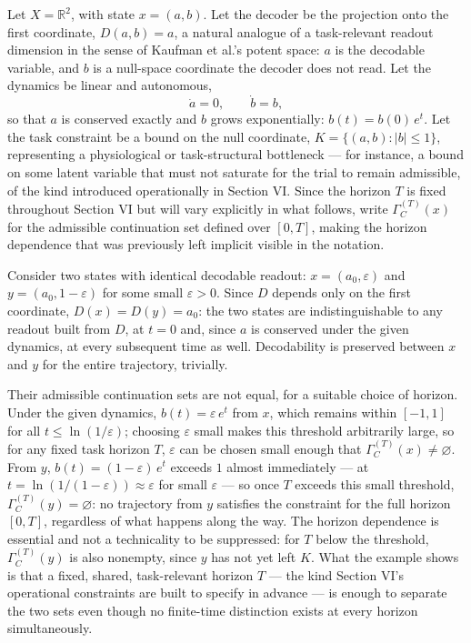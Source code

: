 \documentclass[11pt]{article}
\begin{document}
Let $X = \mathbb{R}^2$, with state $x = (a, b)$. Let the decoder be the projection onto the first coordinate, $D(a,b) = a$, a natural analogue of a task-relevant readout dimension in the sense of Kaufman et al.'s potent space: $a$ is the decodable variable, and $b$ is a null-space coordinate the decoder does not read. Let the dynamics be linear and autonomous,
\[
\dot a = 0, \qquad \dot b = b,
\]
so that $a$ is conserved exactly and $b$ grows exponentially: $b(t) = b(0)\, e^{t}$. Let the task constraint be a bound on the null coordinate, $K = \{(a,b) : |b| \le 1\}$, representing a physiological or task-structural bottleneck — for instance, a bound on some latent variable that must not saturate for the trial to remain admissible, of the kind introduced operationally in Section VI. Since the horizon $T$ is fixed throughout Section VI but will vary explicitly in what follows, write $\Gamma_C^{(T)}(x)$ for the admissible continuation set defined over $[0,T]$, making the horizon dependence that was previously left implicit visible in the notation.

Consider two states with identical decodable readout: $x = (a_0, \varepsilon)$ and $y = (a_0, 1-\varepsilon)$ for some small $\varepsilon > 0$. Since $D$ depends only on the first coordinate, $D(x) = D(y) = a_0$: the two states are indistinguishable to any readout built from $D$, at $t=0$ and, since $a$ is conserved under the given dynamics, at every subsequent time as well. Decodability is preserved between $x$ and $y$ for the entire trajectory, trivially.

Their admissible continuation sets are not equal, for a suitable choice of horizon. Under the given dynamics, $b(t) = \varepsilon\, e^{t}$ from $x$, which remains within $[-1,1]$ for all $t \le \ln(1/\varepsilon)$; choosing $\varepsilon$ small makes this threshold arbitrarily large, so for any fixed task horizon $T$, $\varepsilon$ can be chosen small enough that $\Gamma_C^{(T)}(x) \neq \varnothing$. From $y$, $b(t) = (1-\varepsilon)\, e^{t}$ exceeds $1$ almost immediately — at $t = \ln(1/(1-\varepsilon)) \approx \varepsilon$ for small $\varepsilon$ — so once $T$ exceeds this small threshold, $\Gamma_C^{(T)}(y) = \varnothing$: no trajectory from $y$ satisfies the constraint for the full horizon $[0,T]$, regardless of what happens along the way. The horizon dependence is essential and not a technicality to be suppressed: for $T$ below the threshold, $\Gamma_C^{(T)}(y)$ is also nonempty, since $y$ has not yet left $K$. What the example shows is that a fixed, shared, task-relevant horizon $T$ — the kind Section VI's operational constraints are built to specify in advance — is enough to separate the two sets even though no finite-time distinction exists at every horizon simultaneously.
\end{document}
